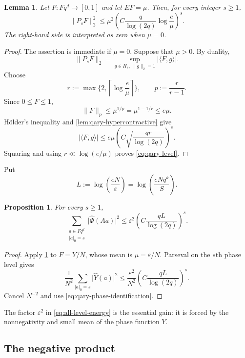 \documentclass[11pt,reqno]{amsart}
\numberwithin{equation}{section}
\newtheorem{proposition}[proposition]{Proposition}
\newtheorem{lemma}[lemma]{Lemma}
\theoremstyle{definition}
\theoremstyle{remark}
\newcommand{\Fq}{\mathbb F_q}
\newcommand{\E}{\mathbb E}
\newcommand{\eps}{\varepsilon}
\newcommand{\wh}{\widehat}
\newcommand{\abs}[1]{\lvert#1\rvert}
\newcommand{\norm}[1]{\lVert#1\rVert}
\newcommand{\angles}[1]{\langle#1\rangle}
\newcommand{\set}[1]{\{#1\}}
\def\Fq{Fq}%
\def\mathbb#1{#1}%
\begin{document}
\begin{lemma}\label{lem:qary-level}
Let $F:\Fq^d\to[0,1]$ and let $\E F=\mu$.  Then, for every integer $s\ge1$,
\begin{equation}\label{eq:qary-level}
 \norm{P_sF}_2^2
 \le
 \mu^2
 \left(
   C\frac{q}{\log(2q)}
   \log\frac e\mu
 \right)^s.
\end{equation}
The right-hand side is interpreted as zero when $\mu=0$.
\end{lemma}

\begin{proof}
The assertion is immediate if $\mu=0$.  Suppose that $\mu>0$.  By duality,
\[
 \norm{P_sF}_2
 =\sup_{g\in H_s,\ \norm g_2=1}
 \abs{\angles{F,g}}.
\]
Choose
\[
 r:=\max\set{2,\left\lceil\log\frac e\mu\right\rceil},
 \qquad
 p:=\frac r{r-1}.
\]
Since $0\le F\le1$,
\[
 \norm F_p\le\mu^{1/p}
 =\mu^{1-1/r}\le e\mu.
\]
H\"older's inequality and \cref{lem:qary-hypercontractive} give
\[
 \abs{\angles{F,g}}
 \le
 e\mu
 \left(
   C\sqrt{\frac{qr}{\log(2q)}}
 \right)^s.
\]
Squaring and using
$r\ll\log(e/\mu)$ proves \eqref{eq:qary-level}.
\end{proof}

Put
\begin{equation}\label{eq:L-def}
 L:=\log\left(\frac{eN}{\eps}\right)
 =\log\left(\frac{eNq^k}{S}\right).
\end{equation}

\begin{proposition}\label{prop:all-level-energy}
For every $s\ge1$,
\begin{equation}\label{eq:all-level-energy}
 \sum_{\substack{a\in\Fq^d\\|a|_0=s}}
 \abs{\wh\Phi(Aa)}^2
 \le
 \eps^2
 \left(
   C\frac{qL}{\log(2q)}
 \right)^s.
\end{equation}
\end{proposition}

\begin{proof}
Apply \cref{lem:qary-level} to $F=Y/N$, whose mean is
$\mu=\eps/N$.  Parseval on the $s$th phase level gives
\[
 \frac1{N^2}
 \sum_{|a|_0=s}\abs{\wh Y(a)}^2
 \le
 \frac{\eps^2}{N^2}
 \left(
   C\frac{qL}{\log(2q)}
 \right)^s.
\]
Cancel $N^{-2}$ and use
\eqref{eq:qary-phase-identification}.
\end{proof}

The factor $\eps^2$ in \eqref{eq:all-level-energy} is the essential gain: it is forced by the nonnegativity and small mean of the phase function $Y$.

\subsection{The negative product}
\end{document}
